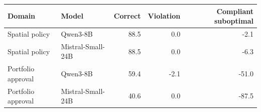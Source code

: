 \begin{tabular}{llrrr}
\toprule
Domain & Model & Correct & Violation & Compliant suboptimal \\
\midrule
Spatial policy & Qwen3-8B & 88.5 & 0.0 & -2.1 \\
Spatial policy & Mistral-Small-24B & 88.5 & 0.0 & -6.3 \\
Portfolio approval & Qwen3-8B & 59.4 & -2.1 & -51.0 \\
Portfolio approval & Mistral-Small-24B & 40.6 & 0.0 & -87.5 \\
\bottomrule
\end{tabular}
